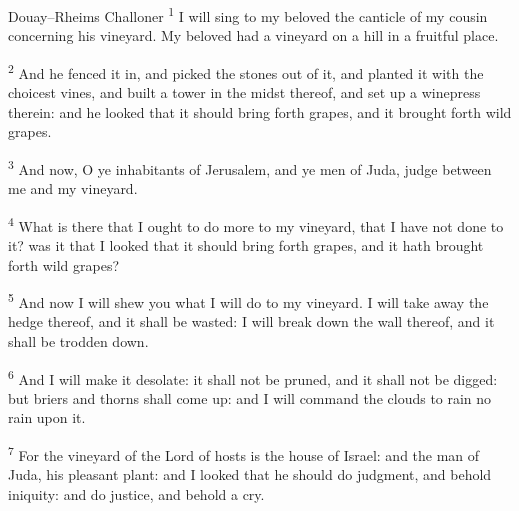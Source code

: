 \begin{englishwitness}{Douay--Rheims Challoner}
\textsuperscript{1} I will sing to my beloved the canticle of my cousin concerning his vineyard. My beloved had a vineyard on a hill in a fruitful place.

\textsuperscript{2} And he fenced it in, and picked the stones out of it, and planted it with the choicest vines, and built a tower in the midst thereof, and set up a winepress therein: and he looked that it should bring forth grapes, and it brought forth wild grapes.

\textsuperscript{3} And now, O ye inhabitants of Jerusalem, and ye men of Juda, judge between me and my vineyard.

\textsuperscript{4} What is there that I ought to do more to my vineyard, that I have not done to it? was it that I looked that it should bring forth grapes, and it hath brought forth wild grapes?

\textsuperscript{5} And now I will shew you what I will do to my vineyard. I will take away the hedge thereof, and it shall be wasted: I will break down the wall thereof, and it shall be trodden down.

\textsuperscript{6} And I will make it desolate: it shall not be pruned, and it shall not be digged: but briers and thorns shall come up: and I will command the clouds to rain no rain upon it.

\textsuperscript{7} For the vineyard of the Lord of hosts is the house of Israel: and the man of Juda, his pleasant plant: and I looked that he should do judgment, and behold iniquity: and do justice, and behold a cry.
\end{englishwitness}

